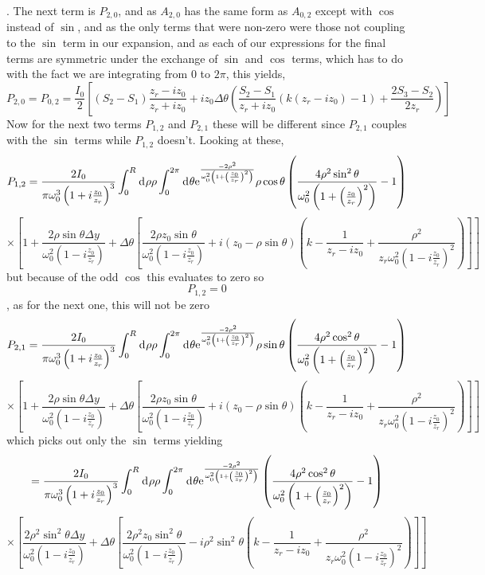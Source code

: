 \documentclass[11pt]{amsart}
\makeatletter
\newcommand{\e}{{\rm e}}				%
\newcommand{\msp}[1]{\mspace{#1mu}}		%
\newcommand{\0}{\varnothing}		%
\newcommand{\dd}{\msp{1} {\rm{d}} \msp{1}}	%
\newcommand{\1}{!}
\newcommand{\2}{@}
\newcommand{\3}{\#}
\newcommand{\4}{\$}
\newcommand{\5}{\%}
\newcommand{\6}{$^\wedge$}
\newcommand{\7}{\&}
\newcommand{\8}{*}
\newcommand{\9}{(}
\makeatother
\begin{document}
. The next term is $P_{2,0}$, and as $A_{2,0}$ has the same form as $A_{0,2}$ except with $\cos$ instead of $\sin$, and as the only terms that were non-zero were those not coupling to the $\sin$ term in our expansion, and as each of our expressions for the final terms are symmetric under the exchange of $\sin$ and $\cos$ terms, which has to do with the fact we are integrating from $0$ to $2\pi$, this yields,
\[
P_{2,0} = P_{0,2} =  \frac{I_0}{2}\left[\left(S_2-S_1\right)\frac{z_r-iz_0}{z_r+iz_0}+iz_0\Delta\theta\left(\frac{S_2-S_1}{z_r+iz_0}\left(k\left(z_r-iz_0\right)-1\right)+\frac{2S_3-S_2}{2z_r}\right)\right]
\]
Now for the next two terms $P_{1,2}$ and $P_{2,1}$ these will be different since $P_{2,1}$ couples with the $\sin$ terms while $P_{1,2}$ doesn't. Looking at these,
\[
P_{1,2} = \frac{2I_0}{\pi\omega_0^3\left(1+i\frac{z_0}{z_r}\right)^3}\int_0^R \dd \rho \rho\int_0^{2\pi}\dd \theta \e^{\frac{-2\rho^2}{\omega_0^2\left(1+\left(\frac{z_0}{z_r}\right)^2\right)}}\rho \cos \theta\left(\frac{4\rho^2\sin^2\theta}{\omega_0^2\left(1+\left(\frac{z_0}{z_r}\right)^2\right)}-1\right)
\]
\[
\times \left[1+\frac{2\rho\sin \theta \Delta y}{\omega_0^2\left(1-i\frac{z_0}{z_r}\right)}+\Delta \theta\left[\frac{2\rho z_0\sin \theta}{\omega_0^2\left(1-i\frac{z_0}{z_r}\right)}+i\left(z_0-\rho\sin\theta\right)\left(k-\frac{1}{z_r-iz_0}+\frac{\rho^2}{z_r\omega_0^2\left(1-i\frac{z_0}{z_r}\right)^2}\right)\right]\right]
\]
but because of the odd $\cos$ this evaluates to zero so 
\[
P_{1,2} = 0
\]
, as for the next one, this will not be zero
\[
P_{2,1} = \frac{2I_0}{\pi\omega_0^3\left(1+i\frac{z_0}{z_r}\right)^3}\int_0^R \dd \rho \rho\int_0^{2\pi}\dd \theta \e^{\frac{-2\rho^2}{\omega_0^2\left(1+\left(\frac{z_0}{z_r}\right)^2\right)}}\rho \sin \theta\left(\frac{4\rho^2\cos^2\theta}{\omega_0^2\left(1+\left(\frac{z_0}{z_r}\right)^2\right)}-1\right)
\]
\[
\times \left[1+\frac{2\rho\sin \theta \Delta y}{\omega_0^2\left(1-i\frac{z_0}{z_r}\right)}+\Delta \theta\left[\frac{2\rho z_0\sin \theta}{\omega_0^2\left(1-i\frac{z_0}{z_r}\right)}+i\left(z_0-\rho\sin\theta\right)\left(k-\frac{1}{z_r-iz_0}+\frac{\rho^2}{z_r\omega_0^2\left(1-i\frac{z_0}{z_r}\right)^2}\right)\right]\right]
\]
which picks out only the $\sin$ terms yielding
\[
=\frac{2I_0}{\pi\omega_0^3\left(1+i\frac{z_0}{z_r}\right)^3}\int_0^R \dd \rho \rho\int_0^{2\pi}\dd \theta \e^{\frac{-2\rho^2}{\omega_0^2\left(1+\left(\frac{z_0}{z_r}\right)^2\right)}}\left(\frac{4\rho^2\cos^2\theta}{\omega_0^2\left(1+\left(\frac{z_0}{z_r}\right)^2\right)}-1\right)
\]
\[
\times \left[\frac{2\rho^2\sin^2 \theta \Delta y}{\omega_0^2\left(1-i\frac{z_0}{z_r}\right)}+\Delta \theta\left[\frac{2\rho ^2z_0\sin^2 \theta}{\omega_0^2\left(1-i\frac{z_0}{z_r}\right)}-i\rho^2\sin^2\theta\left(k-\frac{1}{z_r-iz_0}+\frac{\rho^2}{z_r\omega_0^2\left(1-i\frac{z_0}{z_r}\right)^2}\right)\right]\right]
\]
\end{document}
